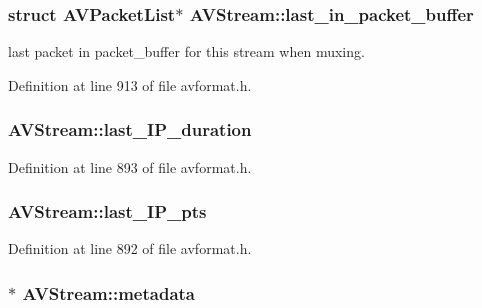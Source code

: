 \subsubsection[{\texorpdfstring{last\+\_\+in\+\_\+packet\+\_\+buffer}{last_in_packet_buffer}}]{\setlength{\rightskip}{0pt plus 5cm}struct {\bf A\+V\+Packet\+List}$\ast$ A\+V\+Stream\+::last\+\_\+in\+\_\+packet\+\_\+buffer}\hypertarget{struct_a_v_stream_ab8d53bc29f0761a3f87ec0b5ed7dc8d4}{}\label{struct_a_v_stream_ab8d53bc29f0761a3f87ec0b5ed7dc8d4}
last packet in packet\+\_\+buffer for this stream when muxing. 

Definition at line 913 of file avformat.\+h.

\subsubsection[{\texorpdfstring{last\+\_\+\+I\+P\+\_\+duration}{last_IP_duration}}]{ A\+V\+Stream\+::last\+\_\+\+I\+P\+\_\+duration}\hypertarget{struct_a_v_stream_a5764343a4d348f453933bf73c26f84c3}{}\label{struct_a_v_stream_a5764343a4d348f453933bf73c26f84c3}


Definition at line 893 of file avformat.\+h.

\subsubsection[{\texorpdfstring{last\+\_\+\+I\+P\+\_\+pts}{last_IP_pts}}]{ A\+V\+Stream\+::last\+\_\+\+I\+P\+\_\+pts}\hypertarget{struct_a_v_stream_af8e7b1373292e393ed210dc15aa8d2ca}{}\label{struct_a_v_stream_af8e7b1373292e393ed210dc15aa8d2ca}


Definition at line 892 of file avformat.\+h.

\subsubsection[{\texorpdfstring{metadata}{metadata}}]{$\ast$ A\+V\+Stream\+::metadata}\hypertarget{struct_a_v_stream_a50d250a128a3da9ce3d135e84213fb82}{}\label{struct_a_v_stream_a50d250a128a3da9ce3d135e84213fb82}


